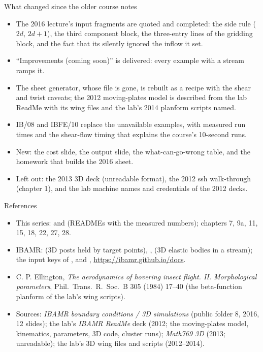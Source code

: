 \documentclass[aspectratio=169,11pt]{beamer}
\begin{document}
\begin{frame}{What changed since the older course notes}
\label{fr:changed}
\footnotesize
\begin{itemize}
  \item The 2016 lecture's input fragments are quoted and completed: the side rule ($2d$, $2d+1$), the third component block, the three-entry lines of the gridding block, and the fact that its  silently ignored the inflow it set.
  \item ``Improvements (coming soon)'' is delivered: every example with a stream ramps it.
  \item The sheet generator, whose file is gone, is rebuilt as a recipe with the shear and twist caveats; the 2012 moving-plates model is described from the lab ReadMe with its wing files and the lab's 2014 planform scripts named.
  \item IB/08 and IBFE/10 replace the unavailable examples, with measured run times and the shear-flow timing that explains the course's 10-second runs.
  \item New: the cost slide, the output slide, the what-can-go-wrong table, and the homework that builds the 2016 sheet.
  \item Left out: the 2013 3D deck (unreadable format), the 2012 ssh walk-through (chapter 1), and the lab machine names and credentials of the 2012 decks.
\end{itemize}
\end{frame}

\begin{frame}{References}
\label{fr:refs}
\scriptsize
\begin{itemize}
  \item This series:  and  (READMEs with the measured numbers); chapters 7, 9a, 11, 15, 18, 22, 27, 28.
  \item IBAMR:  (3D posts held by target points), ,  (3D elastic bodies in a stream); the input keys of ,  and , \url{https://ibamr.github.io/docs}.
  \item C. P. Ellington, \emph{The aerodynamics of hovering insect flight. II. Morphological parameters}, Phil.\ Trans.\ R.\ Soc.\ B 305 (1984) 17--40 (the beta-function planform of the lab's wing scripts).
  \item Sources: \emph{IBAMR boundary conditions / 3D simulations} (public folder 8, 2016, 12 slides); the lab's \emph{IBAMR ReadMe} deck (2012; the moving-plates model, kinematics, parameters, 3D code, cluster runs); \emph{Math769 3D} (2013; unreadable); the lab's 3D wing files and scripts (2012--2014).
\end{itemize}
\end{frame}
\end{document}

